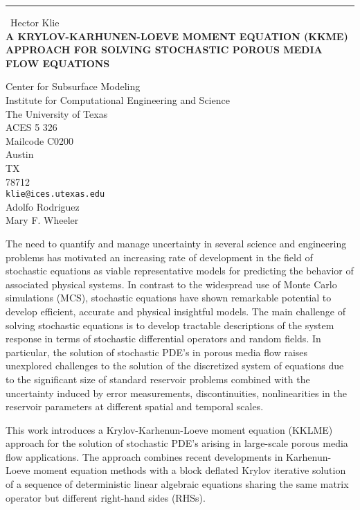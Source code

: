 \documentclass{report}
\begin{document}
\begin{center}
\rule{6in}{1pt} \
{\large Hector Klie \\
{\bf A KRYLOV-KARHUNEN-LOEVE MOMENT EQUATION (KKME) APPROACH FOR SOLVING STOCHASTIC POROUS MEDIA FLOW EQUATIONS}}

Center for Subsurface Modeling \\ Institute for Computational Engineering and Science \\ The University of Texas \\ ACES 5 326 \\ Mailcode C0200 \\ Austin \\ TX \\ 78712
\\
{\tt klie@ices.utexas.edu}\\
Adolfo Rodriguez \\
Mary F. Wheeler\end{center}

The need to quantify and manage uncertainty in several science and
engineering problems has motivated an increasing rate of development
in the field of stochastic equations as viable representative models
for predicting the behavior of associated physical systems. In
contrast to the widespread use of Monte Carlo simulations (MCS),
stochastic equations have shown remarkable potential to develop
efficient, accurate and physical insightful models. The main
challenge of solving stochastic equations is to develop tractable
descriptions of the system response in terms of stochastic
differential operators and random fields. In particular, the
solution of stochastic PDE's in porous media flow raises unexplored
challenges to the solution of the discretized system of equations
due to the significant size of standard reservoir problems combined
with the uncertainty induced by error measurements, discontinuities,
nonlinearities in the reservoir parameters at different spatial and
temporal scales.

This work introduces a Krylov-Karhenun-Loeve moment equation (KKLME)
approach for the solution of stochastic PDE's arising in large-scale
porous media flow applications. The approach combines recent
developments in Karhenun-Loeve moment equation methods with a block
deflated Krylov iterative solution of a sequence of deterministic
linear algebraic equations sharing the same matrix operator but
different right-hand sides (RHSs).
\end{document}
